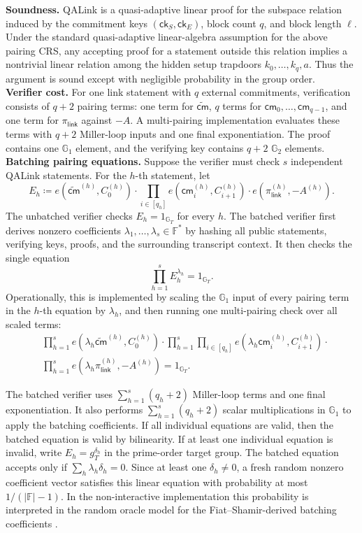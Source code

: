 \documentclass[conference,compsoc]{IEEEtran}
\newcommand{\cm}{\textsf{cm}}
\newcommand{\ck}{\textsf{ck}}
\renewcommand{\ck}{{\textsf{ck}}}
\theoremstyle{plain}
\theoremstyle{definition}
\theoremstyle{remark}
\providecommand{\DIFaddtex}[1]{{\protect\color{DIFADD} \sf #1}} %
\providecommand{\DIFaddbegin}{} %
\providecommand{\DIFadd}[1]{\texorpdfstring{\DIFaddtex{#1}}{#1}} %
\providecommand{\DIFaddincludegraphics}[2][]{{\color{blue}\fbox{\DIFOincludegraphics[#1]{#2}}}} %
\DeclareRobustCommand{\DIFaddbegin}{\DIFOaddbegin \let\includegraphics\DIFaddincludegraphics} %
\begin{document}
\noindent\textbf{Soundness.}
QALink is a quasi-adaptive linear proof for the subspace relation induced by
the commitment keys \((\ck_S,\ck_E)\), block count \(q\), and block length
\(\ell\).  Under the standard quasi-adaptive linear-algebra assumption for the
above pairing CRS, any accepting proof for a statement outside this relation
implies a nontrivial linear relation among the hidden setup trapdoors
\(k_0,\ldots,k_q,a\).  Thus the argument is sound except with negligible
probability in the group order. \\

\noindent\textbf{Verifier cost.}
For one link statement with \(q\) external commitments, verification consists
of \(q+2\) pairing terms:
one term for \(\widetilde{\cm}\), \(q\) terms for
\(\cm_0,\ldots,\cm_{q-1}\), and one term for \(\pi_{\mathsf{link}}\) against
\(-A\).  A multi-pairing implementation evaluates these terms with \(q+2\)
Miller-loop inputs and one final exponentiation.  The proof contains one
\(\mathbb{G}_1\) element, and the verifying key contains \(q+2\)
\(\mathbb{G}_2\) elements. \\

\noindent\textbf{Batching pairing equations.}
Suppose the verifier must check \(s\) independent QALink statements.  For the
\(h\)-th statement, let
\[
  E_h
  \coloneqq
  e(\widetilde{\cm}^{(h)},C^{(h)}_0)
  \cdot
  \prod_{i\in[q_h]} e(\cm^{(h)}_i,C^{(h)}_{i+1})
  \cdot
  e(\pi^{(h)}_{\mathsf{link}},-A^{(h)}).
\]
The unbatched verifier checks \(E_h=1_{\mathbb{G}_T}\) for every \(h\).  The
batched verifier first derives nonzero coefficients
\(\lambda_1,\ldots,\lambda_s\in\mathbb{F}^{\ast}\) by hashing all public
statements, verifying keys, proofs, and the surrounding transcript context.  It
then checks the single equation
\[
  \prod_{h=1}^{s} E_h^{\lambda_h}=1_{\mathbb{G}_T}.
\]
Operationally, this is implemented by scaling the \(\mathbb{G}_1\) input of
every pairing term in the \(h\)-th equation by \(\lambda_h\), and then running
one multi-pairing check over all scaled terms:
\[
\begin{aligned}
  &\prod_{h=1}^{s}
  e(\lambda_h\widetilde{\cm}^{(h)},C^{(h)}_0)
  \cdot
  \prod_{h=1}^{s}\prod_{i\in[q_h]}
  e(\lambda_h\cm^{(h)}_i,C^{(h)}_{i+1})
  \cdot \\
  &\prod_{h=1}^{s}
  e(\lambda_h\pi^{(h)}_{\mathsf{link}},-A^{(h)})
  =
  1_{\mathbb{G}_T}.
\end{aligned}
\]

The batched verifier uses \(\sum_{h=1}^{s}(q_h+2)\) Miller-loop terms and one
final exponentiation.  It also performs \(\sum_{h=1}^{s}(q_h+2)\) scalar
multiplications in \(\mathbb{G}_1\) to apply the batching coefficients.  If all
individual equations are valid, then the batched equation is valid by
bilinearity.  If at least one individual equation is invalid, write
\(E_h=g_T^{\delta_h}\) in the prime-order target group.  The batched equation
accepts only if \(\sum_h \lambda_h\delta_h=0\).  Since at least one
\(\delta_h\neq 0\), a fresh random nonzero coefficient vector satisfies this
linear equation with probability at most \(1/(|\mathbb{F}|-1)\).  In the
non-interactive implementation this probability is interpreted in the random
oracle model for the Fiat--Shamir-derived batching coefficients\DIFaddbegin \DIFadd{.
}\fi
\end{document}
